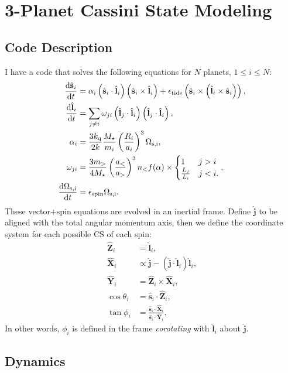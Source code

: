 \documentclass[11pt,
        usenames, %
        dvipsnames %
    ]{article}
\newcommand*{\rd}[2]{\frac{\mathrm{d}#1}{\mathrm{d}#2}}
\newcommand*{\bm}[1]{\boldsymbol{\mathbf{#1}}}
\newcommand*{\uv}[1]{\hat{\bm{#1}}}
\newcommand*{\p}[1]{\left(#1\right)}
\begin{document}
\section{3-Planet Cassini State Modeling}

\subsection{Code Description}

I have a code that solves the following equations for $N$ planets, $1 \leq i
\leq N$:
\begin{align}
    \rd{\uv{s}_i}{t}
        &= \alpha_i \p{\uv{s}_i \cdot \uv{l}_i}\p{\uv{s}_i \times \uv{l}_i}
            + \epsilon_{\rm tide}\p{\uv{s}_i \times \p{\uv{l}_i \times \uv{s}_i}
                },\\
    \rd{\uv{l}_i}{t}
        &= \sum\limits_{j \neq i}
            \omega_{ji} \p{\uv{l}_j \cdot \uv{l}_i}
                \p{\uv{l}_j \cdot \uv{l}_i},\\
    \alpha_i &= \frac{3k_{\rm q}}{2k}
        \frac{M_\star}{m_i}
        \p{\frac{R_i}{a_i}}^3
        \Omega_{\rm s, i},\\
    \omega_{ji} &= \frac{3m_>}{4M_\star}
        \p{\frac{a_<}{a_>}}^3
        n_<
        f(\alpha) \times
        \begin{cases}
            1 & j > i\\
            \frac{L_j}{L_i} & j < i.
        \end{cases},\\
    \rd{\Omega_{\rm s, i}}{t} &= \epsilon_{\rm spin} \Omega_{\rm s, i}.
\end{align}
These vector+spin equations are evolved in an inertial frame. Define $\uv{j}$ to
be aligned with the total angular momentum axis, then we define the coordinate
system for each possible CS of each spin:
\begin{align}
    \uv{Z}_i &= \uv{l}_i,\\
    \uv{X}_i &\propto \uv{j} - \p{\uv{j} \cdot \uv{l}_i}\uv{l}_i,\\
    \uv{Y}_i &= \uv{Z}_i \times \uv{X}_i,\\
    \cos \theta_i &= \uv{s}_i \cdot \uv{Z}_i,\\
    \tan \phi_i &= \frac{\uv{s}_i \cdot \uv{X}_i}{\uv{s}_i \cdot \uv{Y}_i}.
\end{align}
In other words, $\phi_i$ is defined in the frame \emph{corotating} with
$\uv{l}_i$ about $\uv{j}$.

\subsection{Dynamics}
\end{document}

